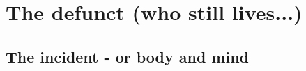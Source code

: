 \begin{comment}
\documentclass{book}
\usepackage{master}
\usepackage{changepage}
\newcommand{\rec}{$\text{R\'ecoltes et Semailles}$}
\newcommand{\no}{n$^\circ$}
\hfuzz = 100pt

\usepackage{titlesec}
\usepackage[dotinlabels]{titletoc}

\titleclass{\nnote}{straight}[\section]
\newcounter{nnote}
\renewcommand{\thennote}{\thesection.\arabic{nnote}}
\titlespacing*{\nnote}{0pt}{3.5ex plus 1ex minus .2ex}{1ex plus .2ex}
\titleformat{\nnote}[runin]{\bfseries }{\bfseries Note }{0pt}{}[]

\titleclass{\subnote}{straight}[\section]
\newcounter{subnote}
\renewcommand{\thesubnote}{\thesection.\arabic{subnote}}
\titlespacing*{\subnote}{0pt}{3.5ex plus 1ex minus .2ex}{1ex plus .2ex}
\titleformat{\subnote}[runin]{\bfseries }{\bfseries Note }{0pt}{}[]

\titlecontents{nnote}[9em]
{}{Note }{}{\titlerule*[1pc]{.}\contentspage}

\titlecontents{subnote}[11em]
{}{Note }{}{\titlerule*[1pc]{.}\contentspage}

\newtheorem{remark}{Remark}
\newtheorem*{remark*}{Remark}




\setcounter{chapter}{16}

\end{comment}

\chapter{The defunct (who still lives...)}
\label{chapter:17}

\section{The incident - or body and mind}

